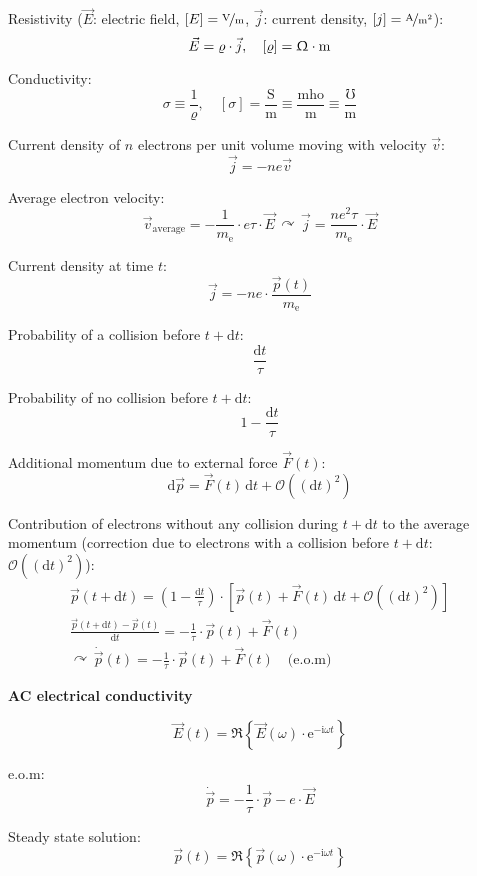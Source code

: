 \documentclass[fontsize=11pt,a4paper]{scrartcl}
\begin{document}
Resistivity ($\vec E$: electric field, $[E]=\nicefrac{\mathrm{V}}{\mathrm{m}}$, $\vec j$: current density, $[j]=\nicefrac{\mathrm{A}}{\mathrm{m}^2}$):
\[
	\vec E=\varrho\cdot\vec j,\quad[\varrho]=\Upomega\cdot\mathrm{m}
\]

Conductivity:
\[
	\sigma\equiv\frac{1}{\varrho},\quad[\sigma]=\frac{\mathrm{S}}{\mathrm{m}}\equiv\frac{\mathrm{mho}}{\mathrm{m}}\equiv\frac{\mho}{\mathrm{m}}
\]

Current density of $n$ electrons per unit volume moving with velocity $\vec v$:
\[
	\vec j=-ne\vec v
\]

Average electron velocity:
\[
	\vec v_\mathrm{average}=-\frac{1}{m_\mathrm{e}}\cdot e\tau\cdot\vec E\,\curvearrowright\,\vec j=\frac{ne^2\tau}{m_\mathrm{e}}\cdot\vec E
\]

Current density at time $t$:
\[
	\vec j=-ne\cdot\frac{\vec p(t)}{m_\mathrm{e}}
\]

Probability of a collision before $t+\mathrm{d}t$:
\[
	\frac{\mathrm{d}t}{\tau}
\]

Probability of no collision before $t+\mathrm{d}t$:
\[
	1-\frac{\mathrm{d}t}{\tau}
\]

Additional momentum due to external force $\vec F(t)$:
\[
	\mathrm{d}\vec p=\vec F(t)\,\mathrm{d}t+\mathcal{O}\left((\mathrm{d}t)^2\right)
\]

Contribution of electrons without any collision during $t+\mathrm{d}t$ to the average momentum (correction due to electrons with a collision before $t+\mathrm{d}t$: $\mathcal{O}\left((\mathrm{d}t)^2\right)$):
\begin{gather*}
	\vec p(t+\mathrm{d}t)=\left(1-\frac{\mathrm{d}t}{\tau}\right)\cdot\left[\vec p(t)+\vec F(t)\,\mathrm{d}t+\mathcal{O}\left((\mathrm{d}t)^2\right)\right]\\
	\frac{\vec p(t+\mathrm{d}t)-\vec p(t)}{\mathrm{d}t}=-\frac{1}{\tau}\cdot\vec p(t)+\vec F(t)\\
	\curvearrowright\,\dot{\vec{p}}(t)=-\frac{1}{\tau}\cdot\vec p(t)+\vec F(t)\quad\text{(e.o.m)}
\end{gather*}

\textbf{\normalsize{AC electrical conductivity}}

\[
	\vec E(t)=\Re\left\{\vec E(\omega)\cdot\mathrm{e}^{-\mathrm{i}\omega t}\right\}
\]

e.o.m:
\[
	\dot{\vec{p}}=-\frac{1}{\tau}\cdot\vec p-e\cdot\vec E
\]

Steady state solution:
\[
	\vec p(t)=\Re\left\{\vec p(\omega)\cdot\mathrm{e}^{-\mathrm{i}\omega t}\right\}
\]
\end{document}
